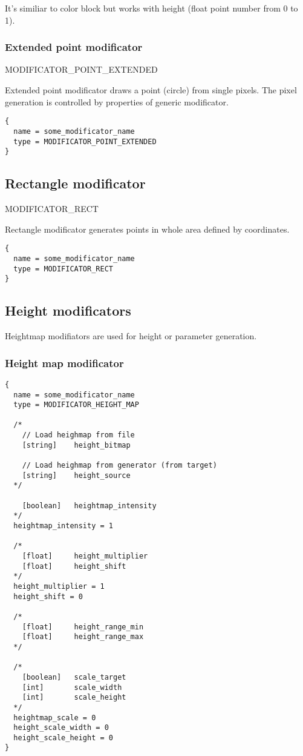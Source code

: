 \documentclass[9pt]{article}
\begin{document}
It's similiar to color block but works with height (float point number
from 0 to 1).

\subsubsection{Extended point modificator}
MODIFICATOR\_POINT\_EXTENDED

Extended point modificator draws a point (circle)
from single pixels. The pixel generation is controlled by 
properties of generic modificator.

\begin{verbatim}
{
  name = some_modificator_name
  type = MODIFICATOR_POINT_EXTENDED
}
\end{verbatim}

\subsection{Rectangle modificator}
MODIFICATOR\_RECT

Rectangle modificator generates points in whole area defined by coordinates.

\begin{verbatim}
{
  name = some_modificator_name
  type = MODIFICATOR_RECT
}
\end{verbatim}

\subsection{Height modificators}

Heightmap modifiators are used for height or parameter generation.

\subsubsection{Height map modificator}

\begin{verbatim}
{
  name = some_modificator_name
  type = MODIFICATOR_HEIGHT_MAP
  
  /*
    // Load heighmap from file
    [string]    height_bitmap
    
    // Load heighmap from generator (from target)
    [string]    height_source
  */
  
    [boolean]   heightmap_intensity
  */
  heightmap_intensity = 1
  
  /*    
    [float]     height_multiplier
    [float]     height_shift
  */
  height_multiplier = 1
  height_shift = 0
  
  /*
    [float]     height_range_min
    [float]     height_range_max
  */
  
  /*  
    [boolean]   scale_target
    [int]       scale_width
    [int]       scale_height
  */
  heightmap_scale = 0
  height_scale_width = 0
  height_scale_height = 0
}
\end{verbatim}
\end{document}
